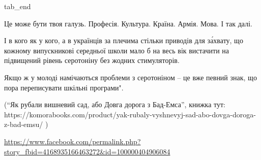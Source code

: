 tab_end
\fi

Це може бути твоя галузь. Професія. Культура. Країна. Армія. Мова. І так далі.

І в кого як у кого, а в українців за плечима стільки приводів для за́хвату, що
кожному випускникові середньої школи мало б на весь вік вистачити на підвищений
рівень серотоніну без жодних стимуляторів. 

Якщо ж у молоді намічаються проблеми з серотоніном – це вже певний знак, що
пора переписувати шкільні програми". 

(\enquote{Як рубали вишневий сад, або Довга дорога з Бад-Емса}, книжка тут:
https://komorabooks.com/product/yak-rubaly-vyshnevyj-sad-abo-dovga-doroga-z-bad-emsu/
)

\url{https://www.facebook.com/permalink.php?story_fbid=4168935166463272&id=100000404906084}
